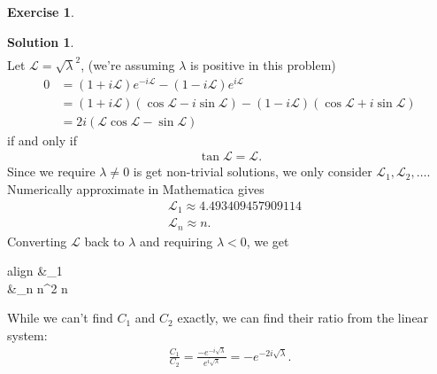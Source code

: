 \documentclass{article}
\theoremstyle{definition}
\newtheorem*{exer*}{Exercise}
\newtheorem*{sln*}{Solution}
\newcommand{\lag}{\mathcal{L}}
\begin{document}
\begin{exer*}
\begin{enumerate}
\begin{sln*}
\begin{align*}
			\end{align*}
			Let $\lag = \sqrt{\lambda}^2$, (we're assuming $\lambda$ is positive in this problem)
			\begin{align*}
			0 &= (1+i\lag)e^{-i\lag} - (1-i\lag)e^{i\lag}\\
			&= (1+i\lag)(\cos\lag - i\sin\lag) - (1-i\lag)(\cos\lag + i\sin\lag)\\
			&= 2i (\lag\cos\lag - \sin\lag)
			\end{align*}
			if and only if
			\begin{align*}
			\boxed{\tan\lag = \lag}.
			\end{align*}
			Since we require $\lambda\neq 0$ is get non-trivial solutions, we only consider $\lag_1,\lag_2,\dots$. Numerically approximate in Mathematica gives
			\begin{align*}
			&\lag_1 \approx 4.493409457909114\\
			&\lag_n \approx n.
			\end{align*}
			Converting $\lag$ back to $\lambda$ and requiring $\lambda < 0$, we get
			\begin{empheq}[box=\fbox]{align} 
			&\lambda_1 \nonumber\\
			&\lambda_n \approx n^2\hspace{0.5cm} n \nonumber 
			\end{empheq}
			While we can't find $C_1$ and $C_2$ exactly, we can find their ratio from the linear system:
			\begin{align*}
			\frac{C_1}{C_2} = \frac{-e^{-i\sqrt{\lambda}}}{e^{i\sqrt{\lambda}}} = -e^{-2i\sqrt{\lambda}}.
			\end{align*}
			

\end{sln*}
\end{enumerate}
\end{exer*}
\end{document}
